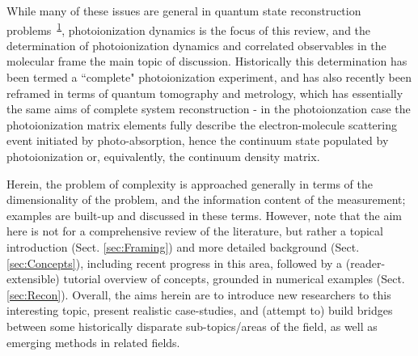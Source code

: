 \documentclass[10pt]{article}
\begin{document}
While many of these issues are general in quantum state reconstruction problems~\textsuperscript{\hyperref[csl:1]{1}}, photoionization dynamics is the focus of this review, and the determination of photoionization dynamics and correlated observables in the molecular frame the main topic of discussion. Historically this determination has been termed a ``complete" photoionization experiment, and has also recently been reframed in terms of quantum tomography and metrology, which has essentially the same aims of complete system reconstruction - in the photoionzation case the photoionization matrix elements fully describe the electron-molecule scattering event initiated by photo-absorption, hence the continuum state populated by photoionization or, equivalently, the continuum density matrix.

Herein, the problem of complexity is approached generally in terms of the dimensionality of the problem, and the information content of the measurement; examples are built-up and discussed in these terms. However, note that the aim here is not for a comprehensive review of the literature, but rather a topical introduction (Sect. \ref{sec:Framing}) and more detailed background (Sect. \ref{sec:Concepts}), including recent progress in this area, followed by a (reader-extensible) tutorial overview of concepts, grounded in numerical examples (Sect. \ref{sec:Recon}). Overall, the aims herein are to introduce new researchers to this interesting topic, present realistic case-studies, and (attempt to) build bridges between some historically disparate sub-topics/areas of the field, as well as emerging methods in related fields.

\end{document}
